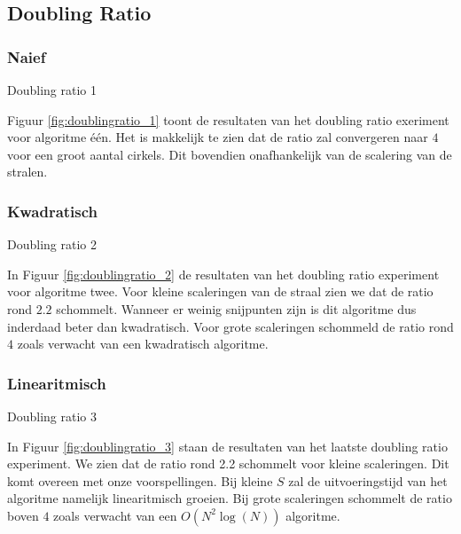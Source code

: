 \subsection{Doubling Ratio}
\subsubsection{Naief}
\begin{table}[H]

\label{fig:doublingratio_1}
\caption{Doubling ratio 1}
\end{table}
Figuur \ref{fig:doublingratio_1} toont de resultaten van het doubling ratio exeriment voor algoritme \'e\'en. Het is makkelijk te zien dat de ratio zal convergeren naar $4$ voor een groot aantal cirkels. Dit bovendien onafhankelijk van de scalering van de stralen.

\subsubsection{Kwadratisch}
\begin{table}[H]

\label{fig:doublingratio_2}
\caption{Doubling ratio 2}
\end{table}
In Figuur \ref{fig:doublingratio_2} de resultaten van het doubling ratio experiment voor algoritme twee. Voor kleine scaleringen van de straal zien we dat de ratio rond $2.2$ schommelt. Wanneer er weinig snijpunten zijn is dit algoritme dus inderdaad beter dan kwadratisch.
Voor grote scaleringen schommeld de ratio rond $4$ zoals verwacht van een kwadratisch algoritme.

\subsubsection{Linearitmisch}
\begin{table}[h]

\label{fig:doublingratio_3}
\caption{Doubling ratio 3}
\end{table}
In Figuur \ref{fig:doublingratio_3} staan de resultaten van het laatste doubling ratio experiment.
We zien dat de ratio rond 2.2 schommelt voor kleine scaleringen.
Dit komt overeen met onze voorspellingen.
Bij kleine $S$ zal de uitvoeringstijd van het algoritme namelijk linearitmisch groeien.
Bij grote scaleringen schommelt de ratio boven $4$ zoals verwacht van een $O(N^2\log(N))$ algoritme.

